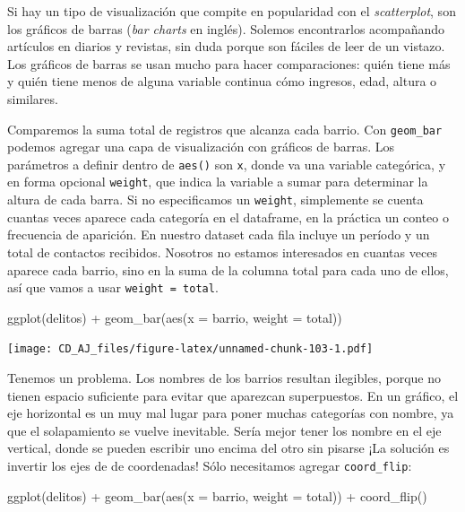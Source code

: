 \documentclass[
]{book}
\newenvironment{Shaded}{\begin{snugshade}}{\end{snugshade}}
\newcommand{\AttributeTok}[1]{\textcolor[rgb]{0.77,0.63,0.00}{#1}}
\newcommand{\FunctionTok}[1]{\textcolor[rgb]{0.00,0.00,0.00}{#1}}
\newcommand{\NormalTok}[1]{#1}
\newcommand{\SpecialCharTok}[1]{\textcolor[rgb]{0.00,0.00,0.00}{#1}}
\begin{document}
Si hay un tipo de visualización que compite en popularidad con el \emph{scatterplot}, son los gráficos de barras (\emph{bar charts} en inglés). Solemos encontrarlos acompañando artículos en diarios y revistas, sin duda porque son fáciles de leer de un vistazo. Los gráficos de barras se usan mucho para hacer comparaciones: quién tiene más y quién tiene menos de alguna variable continua cómo ingresos, edad, altura o similares.

Comparemos la suma total de registros que alcanza cada barrio. Con \texttt{geom\_bar} podemos agregar una capa de visualización con gráficos de barras. Los parámetros a definir dentro de \texttt{aes()} son \texttt{x}, donde va una variable categórica, y en forma opcional \texttt{weight}, que indica la variable a sumar para determinar la altura de cada barra. Si no especificamos un \texttt{weight}, simplemente se cuenta cuantas veces aparece cada categoría en el dataframe, en la práctica un conteo o frecuencia de aparición. En nuestro dataset cada fila incluye un período y un total de contactos recibidos. Nosotros no estamos interesados en cuantas veces aparece cada barrio, sino en la suma de la columna total para cada uno de ellos, así que vamos a usar \texttt{weight\ =\ total}.

\begin{Shaded}
\begin{Highlighting}[]
\FunctionTok{ggplot}\NormalTok{(delitos) }\SpecialCharTok{+}
    \FunctionTok{geom\_bar}\NormalTok{(}\FunctionTok{aes}\NormalTok{(}\AttributeTok{x =}\NormalTok{ barrio, }\AttributeTok{weight =}\NormalTok{ total))}
\end{Highlighting}
\end{Shaded}

\texttt{[image: CD\_AJ\_files/figure-latex/unnamed-chunk-103-1.pdf]}

Tenemos un problema. Los nombres de los barrios resultan ilegibles, porque no tienen espacio suficiente para evitar que aparezcan superpuestos. En un gráfico, el eje horizontal es un muy mal lugar para poner muchas categorías con nombre, ya que el solapamiento se vuelve inevitable. Sería mejor tener los nombre en el eje vertical, donde se pueden escribir uno encima del otro sin pisarse ¡La solución es invertir los ejes de de coordenadas! Sólo necesitamos agregar \texttt{coord\_flip}:

\begin{Shaded}
\begin{Highlighting}[]
\FunctionTok{ggplot}\NormalTok{(delitos) }\SpecialCharTok{+}
    \FunctionTok{geom\_bar}\NormalTok{(}\FunctionTok{aes}\NormalTok{(}\AttributeTok{x =}\NormalTok{ barrio, }\AttributeTok{weight =}\NormalTok{ total)) }\SpecialCharTok{+}
    \FunctionTok{coord\_flip}\NormalTok{()}
\end{Highlighting}
\end{Shaded}
\end{document}
